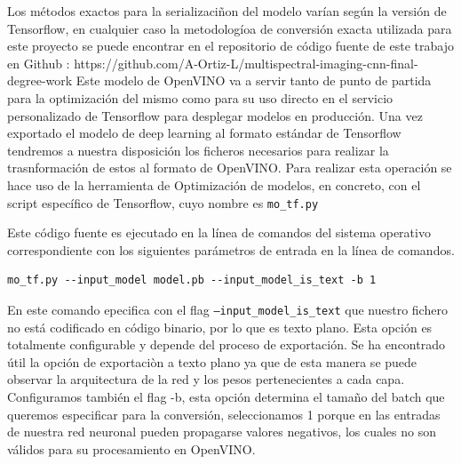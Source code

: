 Los métodos exactos para la serializaciñon del modelo varían según la versión de Tensorflow, en cualquier caso la metodologíoa de conversión exacta utilizada
para este proyecto se puede encontrar en el repositorio de código fuente de este trabajo en Github : https://github.com/A-Ortiz-L/multispectral-imaging-cnn-final-degree-work
Este modelo de OpenVINO va a servir tanto de punto de partida para la optimización del mismo como para su uso directo en el servicio personalizado de Tensorflow para desplegar
modelos en producción.
Una vez exportado el modelo de deep learning al formato estándar de Tensorflow tendremos a nuestra disposición los ficheros necesarios para realizar la trasnformación de estos al formato de OpenVINO.
Para realizar esta operación se hace uso de la herramienta de Optimización de modelos, en concreto, con el script específico de Tensorflow, cuyo nombre
es \texttt{mo\_tf.py}

Este código fuente es ejecutado en la línea de comandos del sistema operativo correspondiente con los siguientes parámetros de entrada en la línea de comandos.


\begin{lstlisting}[caption=Comando de terminal para convertir un modelo Tensorflow a uno de OpenVINO.,
  label=a_label,
  float=t]
    mo_tf.py --input_model model.pb --input_model_is_text -b 1
\end{lstlisting}

En este comando epecifica con el flag \texttt{--input\_model\_is\_text} que nuestro fichero no está codificado en código binario, por lo que es texto plano.
Esta opción es totalmente configurable y depende del proceso de exportación.
Se ha encontrado útil la opción de exportaciòn a texto plano ya que de esta manera
se puede observar la arquitectura de la red y los pesos pertenecientes a cada capa.
Configuramos también el flag -b, esta opción determina el tamaño del batch que queremos especificar para la conversión, seleccionamos 1 porque en las entradas de nuestra red neuronal pueden propagarse valores
negativos, los cuales no son válidos para su procesamiento en OpenVINO.

